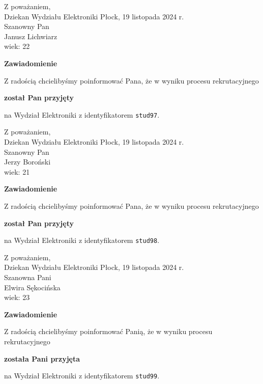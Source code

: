 \documentclass[12pt,a4paper]{article}
\begin{document}
\noindent
Z poważaniem,\\
Dziekan
Wydziału Elektroniki
\newpage
\hfill Płock, 19 listopada 2024 r.\\ 
\noindent 
Szanowny Pan \\
Janusz Lichwiarz \\
wiek: 22

\bigskip

\begin{center}
{\Large\textbf{Zawiadomienie}}
\end{center}
\bigskip
Z radością chcielibyśmy poinformować Pana, że w wyniku procesu rekrutacyjnego
\begin{center}
\textsf{\textbf{został Pan przyjęty}} 
\end{center}
na Wydział Elektroniki z identyfikatorem \verb|stud97|.
\vspace{2cm}

\noindent
Z poważaniem,\\
Dziekan
Wydziału Elektroniki
\newpage
\hfill Płock, 19 listopada 2024 r.\\ 
\noindent 
Szanowny Pan \\
Jerzy Boroński \\
wiek: 21

\bigskip

\begin{center}
{\Large\textbf{Zawiadomienie}}
\end{center}
\bigskip
Z radością chcielibyśmy poinformować Pana, że w wyniku procesu rekrutacyjnego
\begin{center}
\textsf{\textbf{został Pan przyjęty}} 
\end{center}
na Wydział Elektroniki z identyfikatorem \verb|stud98|.
\vspace{2cm}

\noindent
Z poważaniem,\\
Dziekan
Wydziału Elektroniki
\newpage
\hfill Płock, 19 listopada 2024 r.\\ 
\noindent 
Szanowna Pani \\
Elwira Sękocińska \\
wiek: 23

\bigskip

\begin{center}
{\Large\textbf{Zawiadomienie}}
\end{center}
\bigskip
Z radością chcielibyśmy poinformować Panią, że w wyniku procesu rekrutacyjnego
\begin{center}
\textsf{\textbf{została Pani przyjęta}} 
\end{center}
na Wydział Elektroniki z identyfikatorem \verb|stud99|.
\vspace{2cm}
\end{document}

